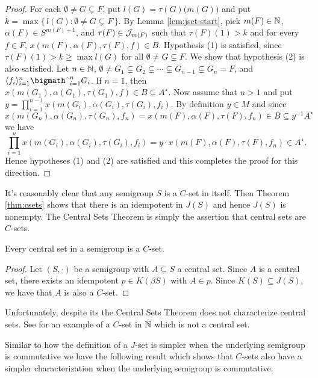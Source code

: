 \begin{proof}
  For each $\emptyset \ne G \subsetneq F$, put $l(G) = \tau(G)\bigl( m(G) \bigr)$ and put $k = \max\{\, l(G) : \emptyset \ne G \subsetneq F \,\}$.
  By Lemma \ref{lem:jset-start}, pick $m(F) \in \mathbb{N}$, $\alpha(F) \in S^{m(F)+1}$, and $\tau(F) \in \mathcal{J}_{m(F)}$ such that $\tau(F)(1) > k$ and for every $f \in F$, $x(m(F), \alpha(F), \tau(F), f) \in B$.
  Hypothesis (1) is satisfied, since $\tau(F)(1) > k \ge \max l(G)$ for all $\emptyset \ne G \subsetneq F$.
  We show that hypothesis (2) is also satisfied.
  Let $n \in \mathbb{N}$, $\emptyset \ne G_1 \subsetneq G_2 \subsetneq \cdots \subsetneq G_{n-1} \subsetneq G_n = F$, and $\la f_i \ra_{i=1}^n \bigtimes_{i=1}^n G_i$. 
  If $n = 1$, then $x(m(G_1), \alpha(G_1), \tau(G_1), f) \in B \subseteq A^\star$.
  Now assume that $n > 1$ and put $y = \prod_{i=1}^{n-1} x(m(G_i), \alpha(G_i), \tau(G_i), f_i)$. 
  By definition $y \in M$ and since $x(m(G_n), \alpha(G_n), \tau(G_n), f_n) = x(m(F), \alpha(F), \tau(F), f_n) \in B \subseteq y^{-1}A^\star$ we have
  \[
    \textstyle
    \prod_{i=1}^n x(m(G_i), \alpha(G_i), \tau(G_i), f_i) = y \cdot x(m(F), \alpha(F), \tau(F), f_n) \in A^\star.
  \]
  Hence hypotheses (1) and (2) are satisfied and this completes the proof for this direction.
\end{proof}

It's reasonably clear that any semigroup $S$ is a $C$-set in itself.
Then Theorem \ref{thm:csets} shows that there is an idempotent in $J(S)$ and hence $J(S)$ is nonempty.
The Central Sets Theorem is simply the assertion that central sets are $C$-sets. 

\begin{cor}
  \label{cor:cst}
  Every central set in a semigroup is a $C$-set.
\end{cor}
\begin{proof}
  Let $(S, \cdot)$ be a semigroup with $A \subseteq S$ a central set. 
  Since $A$ is a central set, there exists an idempotent $p \in K(\beta S)$ with $A \in p$.
  Since $K(S) \subseteq J(S)$, we have that $A$ is also a $C$-set.
\end{proof}
\begin{rmk}
  Unfortunately, despite its the Central Sets Theorem does not characterize central sets. 
  See \cite{Hindman:2007fk} for an example of a $C$-set in $\mathbb{N}$ which is not a central set.   
\end{rmk}

Similar to how the definition of a $J$-set is simpler when the underlying semigroup is commutative we have the following result which shows that $C$-sets also have a simpler characterization when the underlying semigroup is commutative. 

